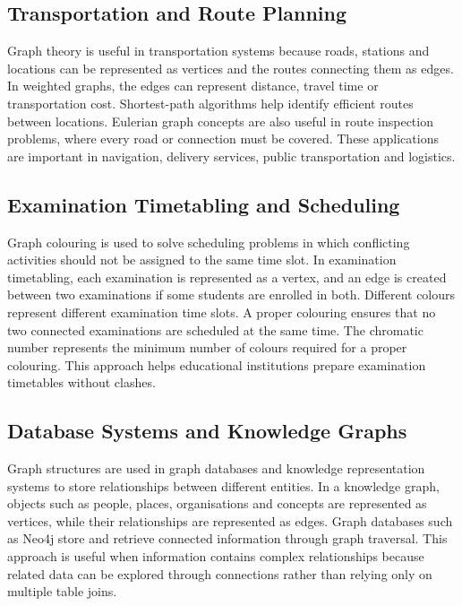 \documentclass[12pt,a4paper]{article}
\begin{document}
\subsection{Transportation and Route Planning}

Graph theory is useful in transportation systems because roads,
stations and locations can be represented as vertices and the
routes connecting them as edges. In weighted graphs, the edges
can represent distance, travel time or transportation cost.
Shortest-path algorithms help identify efficient routes between
locations. Eulerian graph concepts are also useful in route
inspection problems, where every road or connection must be
covered. These applications are important in navigation,
delivery services, public transportation and logistics.

\subsection{Examination Timetabling and Scheduling}

Graph colouring is used to solve scheduling problems in which
conflicting activities should not be assigned to the same time
slot. In examination timetabling, each examination is represented
as a vertex, and an edge is created between two examinations
if some students are enrolled in both. Different colours represent
different examination time slots. A proper colouring ensures
that no two connected examinations are scheduled at the same
time. The chromatic number represents the minimum number
of colours required for a proper colouring. This approach helps
educational institutions prepare examination timetables without
clashes.



\subsection{Database Systems and Knowledge Graphs}

Graph structures are used in graph databases and knowledge
representation systems to store relationships between different
entities. In a knowledge graph, objects such as people, places,
organisations and concepts are represented as vertices, while
their relationships are represented as edges. Graph databases
such as Neo4j store and retrieve connected information through
graph traversal. This approach is useful when information
contains complex relationships because related data can be
explored through connections rather than relying only on
multiple table joins.
\end{document}
